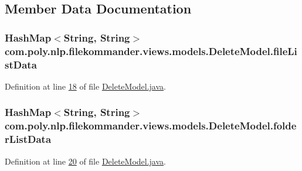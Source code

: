 \subsection{Member Data Documentation}
\hypertarget{classcom_1_1poly_1_1nlp_1_1filekommander_1_1views_1_1models_1_1_delete_model_a3ff23db5a93631b8e56d9797fad7a866}{
\subsubsection[{file\-List\-Data}]{\setlength{\rightskip}{0pt plus 5cm}Hash\-Map$<$String, String$>$ com.\-poly.\-nlp.\-filekommander.\-views.\-models.\-Delete\-Model.\-file\-List\-Data\hspace{0.3cm}{\ttfamily [private]}}}\label{classcom_1_1poly_1_1nlp_1_1filekommander_1_1views_1_1models_1_1_delete_model_a3ff23db5a93631b8e56d9797fad7a866}


Definition at line \hyperlink{L18}{18} of file \hyperlink{}{Delete\-Model.\-java}.

\hypertarget{classcom_1_1poly_1_1nlp_1_1filekommander_1_1views_1_1models_1_1_delete_model_a4152e1b4fc47f32d0bcc2793da662ab9}{
\subsubsection[{folder\-List\-Data}]{\setlength{\rightskip}{0pt plus 5cm}Hash\-Map$<$String, String$>$ com.\-poly.\-nlp.\-filekommander.\-views.\-models.\-Delete\-Model.\-folder\-List\-Data\hspace{0.3cm}{\ttfamily [private]}}}\label{classcom_1_1poly_1_1nlp_1_1filekommander_1_1views_1_1models_1_1_delete_model_a4152e1b4fc47f32d0bcc2793da662ab9}


Definition at line \hyperlink{L20}{20} of file \hyperlink{}{Delete\-Model.\-java}.

